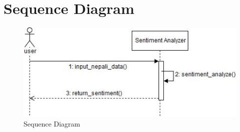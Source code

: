         \section{Sequence Diagram}
        \begin{figure}[h]
		    \centering
			    \includegraphics[width=1.0\textwidth]{./img/5.3.jpg}
			    \caption{Sequence Diagram}
		\end{figure}